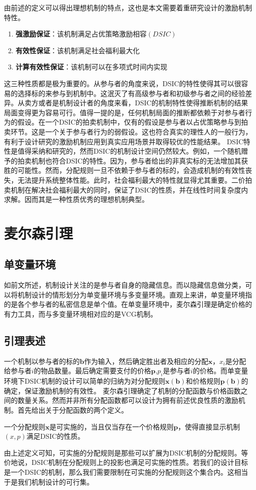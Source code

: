 \documentclass[promaster]{thesis-uestc}
\begin{document}
由前述的定义可以得出理想机制的特点，这也是本文需要着重研究设计的激励机制特性。
\begin{enumerate}
    \item \textbf{强激励保证}：该机制满足占优策略激励相容$(DSIC)$
    \item  \textbf{有效性保证}：该机制满足社会福利最大化
    \item \textbf{计算有效性保证}：该机制可以在多项式时间内实现
\end{enumerate}
这三种性质都是极为重要的。从参与者的角度来说，DSIC的特性使得其可以很容易的选择标的来参与到机制中。这泯灭了有高级参与者和初级参与者之间的经验差异。从卖方或者是机制设计者的角度来看，DSIC的机制特性使得推断机制的结果局面变得更为容易可行。值得一提的是，任何机制局面的推断都依赖于对参与者行为的假设。在一个DSIC的拍卖机制中，仅有的假设是参与者以占优策略参与到拍卖环节。这是一个关于参与者行为的弱假设。这也符合真实的理性人的一般行为，有利于设计研究的激励机制应用到真实应用场景并取得较优的性能结果。
DSIC特性是值得采纳和研究的，然而DSIC的机制设计空间仍然较大。例如，一个随机赠予的拍卖机制也符合DSIC的特性。因为，参与者给出的非真实标的无法增加其获胜的可能性。然而，分配规则一旦不依赖于参与者的标的，会造成机制的有效性丧失，无法提升系统整体性能。此时，社会福利最大的特性就显得尤其重要。二价拍卖机制在解决社会福利最大的同时，保证了DSIC的性质，并在线性时间复杂度内求解。因而其是一种性质优秀的理想机制典型。

\section{麦尔森引理}
\subsection{单变量环境}
如前文所述，机制设计关注的是参与者自身的隐藏信息。而以隐藏信息做分类，可以将机制设计的情形划分为单变量环境与多变量环境。直观上来讲，单变量环境指的是各个参与者的私密信息是单个值。在单变量环境中，麦尔森引理是确定价格的有力工具，而与多变量环境相对应的是VCG机制。
\subsection{引理表述}
一个机制以参与者的标的$\mathbf{b}$作为输入，然后确定胜出者及相应的分配$\mathbf{x}$，$x_i$是分配给参与者$i$的物品数量。最后确定需要支付的价格$\mathbf{p}$,$p_i$是参与者$i$的价格。而单变量环境下DSIC机制的设计可以简单的归纳为对分配规则$\mathbf{x(b)}$和价格规则$\mathbf{p(b)}$的确定，保证激励机制的有效性。
麦尔森引理确定了机制的分配函数与价格函数之间的数量关系。然而并非所有分配函数都可以设计为拥有前述优良性质的激励机制。首先给出关于分配函数的两个定义。
\begin{definition}[可实施的分配规则]
一个分配规则$\mathbf{x}$是可实施的，当且仅当存在一个价格规则$\mathbf{p}$，使得直接显示机制$(x,p)$满足DSIC的性质。
\end{definition}
由上述定义可知，可实施的分配规则是那些可以扩展为DSIC机制的分配规则。等价地说，DSIC机制在分配规则上的投影也满足可实施的性质。若我们的设计目标是一个DSIC的机制，那么我们需要限制在可实施的分配规则这个集合内。这相当于是我们机制设计的可行集。
\end{document}
